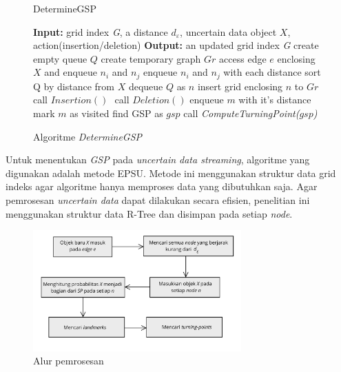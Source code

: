 \documentclass[conference]{IEEEtran}
\begin{document}
\begin{figure}[H]
	\begin{algorithm}[H]
		\label{algo:gsp}
		\caption{DetermineGSP}
		\begin{algorithmic}[1]
			\State \textbf{Input: }grid index \textit{G}, a distance $ d_\varepsilon $, uncertain data object $ X $, action(insertion/deletion)
			\State \textbf{Output: }an updated grid index \textit{G}
			\State create empty queue $ Q $
			\State create temporary graph $ Gr $
			\State access edge $ e $ enclosing $ X $ and enqueue $ n_i  $ and $ n_j $
			\State enqueue $ n_i $ and $ n_j $ with each distance
			\State sort Q by distance from $ X $
			\State dequeue $ Q $ as $ n $
			\State insert grid enclosing $ n $ to $ Gr $
			call $ Insertion() $
			\Else
			$ $ call $ Deletion() $
			\EndIf
			\State enqueue $ m $ with it's distance
			\State mark $ m $ as visited
			\EndIf
			\EndFor
			\EndIf
			\EndWhile
			\State find GSP as $ gsp $
			\State call \textit{ComputeTurningPoint($ gsp $)}
			\EndFor
		\end{algorithmic}
	\end{algorithm}
	\caption{Algoritme \textit{DetermineGSP}}
\end{figure}

Untuk menentukan \textit{GSP} pada \textit{uncertain data streaming}, algoritme yang digunakan adalah metode EPSU\cite{effectiveprob}. Metode ini menggunakan struktur data grid indeks agar algoritme hanya memproses data yang dibutuhkan saja. Agar pemrosesan \textit{uncertain data} dapat dilakukan secara efisien, penelitian ini menggunakan struktur data R-Tree dan disimpan pada setiap \textit{node}.

\begin{figure}[H]
	\centering
	\includegraphics[width=8cm]{img/alur.png}
	\caption{Alur pemrosesan}
	\label{fig:alur}
\end{figure}
\end{document}
